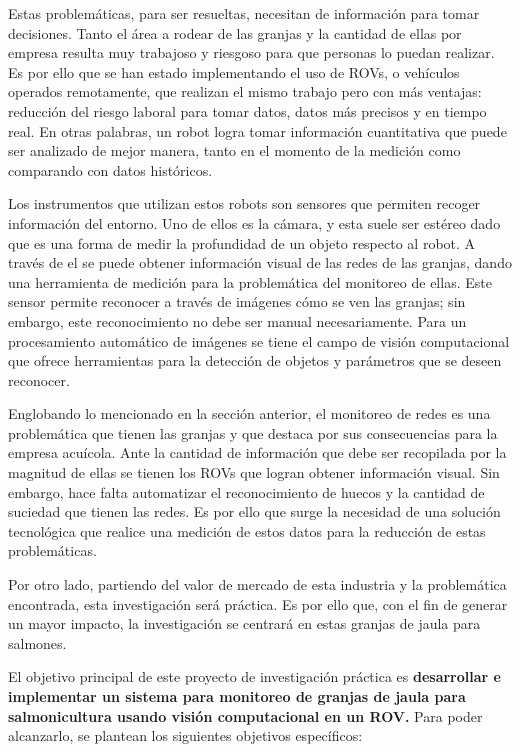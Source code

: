 Estas problemáticas, para ser resueltas, necesitan de información para tomar decisiones. Tanto el área a rodear de las granjas y la cantidad de ellas por empresa resulta muy trabajoso y riesgoso para que personas lo puedan realizar. Es por ello que se han estado implementando el uso de ROVs, o vehículos operados remotamente, que realizan el mismo trabajo pero con más ventajas: reducción del riesgo laboral para tomar datos, datos más precisos y en tiempo real. En otras palabras, un robot logra tomar información cuantitativa que puede ser analizado de mejor manera, tanto en el momento de la medición como comparando con datos históricos.

Los instrumentos que utilizan estos robots son sensores que permiten recoger información del entorno. Uno de ellos es la cámara, y esta suele ser estéreo dado que es una forma de medir la profundidad de un objeto respecto al robot. A través de el se puede obtener información visual de las redes de las granjas, dando una herramienta de medición para la problemática del monitoreo de ellas. Este sensor permite reconocer a través de imágenes cómo se ven las granjas; sin embargo, este reconocimiento no debe ser manual necesariamente. Para un procesamiento automático de imágenes se tiene el campo de visión computacional que ofrece herramientas para la detección de objetos y parámetros que se deseen reconocer. 


Englobando lo mencionado en la sección anterior, el monitoreo de redes es una problemática que tienen las granjas y que destaca por sus consecuencias para la empresa acuícola. Ante la cantidad de información que debe ser recopilada por la magnitud de ellas se tienen los ROVs que logran obtener información visual. Sin embargo, hace falta automatizar el reconocimiento de huecos y la cantidad de suciedad que tienen las redes. Es por ello que surge la necesidad de una solución tecnológica que realice una medición de estos datos para la reducción de estas problemáticas.

Por otro lado, partiendo del valor de mercado de esta industria y la problemática encontrada, esta investigación será práctica. Es por ello que, con el fin de generar un mayor impacto, la investigación se centrará en estas granjas de jaula para salmones.  


El objetivo principal de este proyecto de investigación práctica es \textbf{desarrollar e implementar un sistema para monitoreo de granjas de jaula para salmonicultura usando visión computacional en un ROV.} Para poder alcanzarlo, se plantean los siguientes objetivos específicos:

